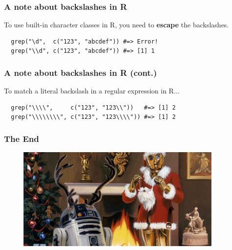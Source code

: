 \documentclass{beamer}
\begin{document}
\begin{frame}[fragile]
  \frametitle{A note about backslashes in R}
  To use built-in character classes in R, you need to \textbf{escape} the
  backslashes.
  \vspace{3mm}

\begin{verbatim}
  grep("\d",  c("123", "abcdef")) #=> Error!
  grep("\\d", c("123", "abcdef")) #=> [1] 1
\end{verbatim}
\end{frame}
\begin{frame}[fragile]
  \frametitle{A note about backslashes in R (cont.)}
  To match a literal backslash in a regular expression in R...
  \vspace{3mm}

\begin{verbatim}
  grep("\\\\",     c("123", "123\\"))   #=> [1] 2
  grep("\\\\\\\\", c("123", "123\\\\")) #=> [1] 2
\end{verbatim}
\end{frame}
\begin{frame}
  \frametitle{The End}
  \begin{figure}[h]
    \centering
    \includegraphics[width=4in]{"star-wars-christmas"}
  \end{figure}
\end{frame}
\end{document}
